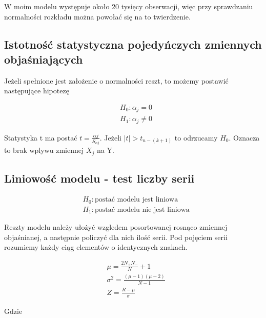 W moim modelu występuje około 20 tysięcy obserwacji, więc przy sprawdzaniu normalności rozkładu można powołać się na to twierdzenie.

\subsection{Istotność statystyczna pojedyńczych zmiennych objaśniających}\label{subsec:istotność-statystyczna-zmiennych-objaśniających}
Jeżeli spełnione jest założenie o normalności reszt, to możemy postawić następujące hipotezę

\begin{equation}
    \begin{split}
        &H_0: \alpha_j = 0 \\
        &H_1: \alpha_j \ne 0
    \end{split}
\end{equation}

Statystyka t ma postać \(t = \frac{\alpha j}{S_{\alpha j}}\).
Jeżeli \(|t| > t_{n -(k+1)}\) to odrzucamy \(H_0\).
Oznacza to brak wplywu zmiennej \(X_j\) na Y.

\subsection{Liniowość modelu - test liczby serii}\label{subsec:liniowość-modelu---test-liczby-serii}

\begin{equation}
    \begin{split}
        &H_0: \text{postać modelu jest liniowa} \\
        &H_1: \text{postać modelu nie jest liniowa}
    \end{split}
\end{equation}

Reszty modelu należy ułożyć wzgledem posortowanej rosnąco zmiennej objaśnianej, a następnie policzyć dla nich ilość serii.
Pod pojęciem serii rozumiemy każdy ciąg elementów o identycznych znakach.

\begin{equation}
    \begin{split}
        &\mu = \frac{2N_+ N_-}{N} +1 \\
        &\sigma^2 = \frac{(\mu -1)(\mu-2)}{N-1} \\
        &Z = \frac{R - \mu}{\sigma}
    \end{split}
\end{equation}


Gdzie

